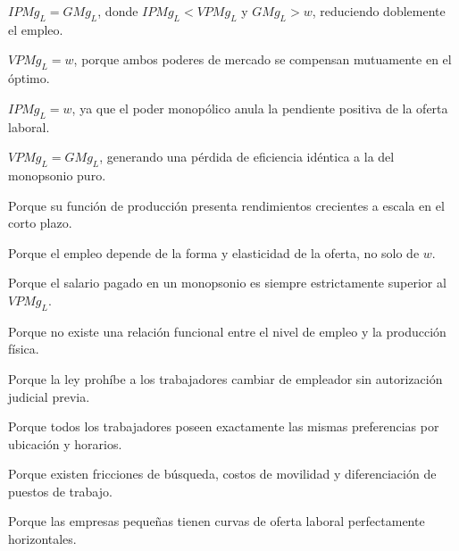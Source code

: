 \begin{opts}
    \item $IPMg_L = GMg_L$, donde $IPMg_L < VPMg_L$ y $GMg_L > w$, reduciendo doblemente el empleo.
    \item $VPMg_L = w$, porque ambos poderes de mercado se compensan mutuamente en el óptimo.
    \item $IPMg_L = w$, ya que el poder monopólico anula la pendiente positiva de la oferta laboral.
    \item $VPMg_L = GMg_L$, generando una pérdida de eficiencia idéntica a la del monopsonio puro.
\end{opts}

\begin{opts}
    \item Porque su función de producción presenta rendimientos crecientes a escala en el corto plazo.
    \item Porque el empleo depende de la forma y elasticidad de la oferta, no solo de $w$.
    \item Porque el salario pagado en un monopsonio es siempre estrictamente superior al $VPMg_L$.
    \item Porque no existe una relación funcional entre el nivel de empleo y la producción física.
\end{opts}

\begin{opts}
    \item Porque la ley prohíbe a los trabajadores cambiar de empleador sin autorización judicial previa.
    \item Porque todos los trabajadores poseen exactamente las mismas preferencias por ubicación y horarios.
    \item Porque existen fricciones de búsqueda, costos de movilidad y diferenciación de puestos de trabajo.
    \item Porque las empresas pequeñas tienen curvas de oferta laboral perfectamente horizontales.
\end{opts}

